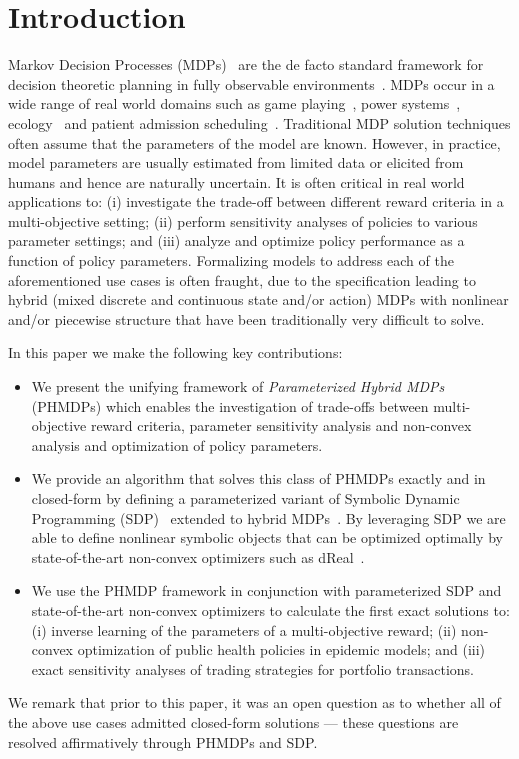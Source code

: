 \section{Introduction}
\label{sec:introduction}

Markov Decision Processes (MDPs)~\parencite{Howard_MIT_1960} are the de facto standard framework for decision theoretic planning in fully observable environments~\parencite{Boutilier_JAIR_1999}. MDPs occur in a wide range of real world domains such as game playing~\parencite{Szita_RL_2012}, power systems~\parencite{Reddy_IJCAI_2011}, ecology~\parencite{Williams_EM_2009} and patient admission scheduling~\parencite{Zhu_AIM_2014}. Traditional MDP solution techniques often assume that the parameters of the model are known. However, in practice, model parameters are usually estimated from limited data or elicited from humans and hence are naturally uncertain. It is often critical in real world applications to: (i) investigate the trade-off between different reward criteria in a multi-objective setting; (ii) perform sensitivity analyses of policies to various parameter settings; and (iii) analyze and optimize policy performance as a function of policy parameters.  Formalizing models to address each of the aforementioned use cases is often fraught, due to the specification leading to hybrid (mixed discrete and continuous state and/or action) MDPs with nonlinear and/or piecewise structure that have been traditionally very difficult to solve.

In this paper we make the following key contributions:
\begin{itemize}
\item We present the unifying framework of {\it Parameterized Hybrid MDPs} (PHMDPs) which enables the investigation of trade-offs between multi-objective reward criteria, parameter sensitivity analysis and non-convex analysis and optimization of policy parameters.

\item We provide an algorithm that solves this class of PHMDPs exactly and in closed-form by defining a parameterized variant of Symbolic Dynamic Programming (SDP)~\parencite{Boutilier_IJCAI_2001} extended to hybrid MDPs~\parencite{Sanner_UAI_2011}. By leveraging SDP we are able to define nonlinear symbolic objects that can be optimized optimally by state-of-the-art non-convex optimizers such as dReal~\parencite{Gao2013}.

\item We use the PHMDP framework in conjunction with parameterized SDP and state-of-the-art non-convex optimizers to calculate the first exact solutions to: (i) inverse learning of the parameters of a multi-objective reward; (ii) non-convex optimization of public health policies in epidemic models; and (iii) exact sensitivity analyses of trading strategies for portfolio transactions. 
\end{itemize}

We remark that prior to this paper, it was an open question as to whether all of the above use cases admitted closed-form solutions --- these questions are resolved affirmatively through PHMDPs and SDP.